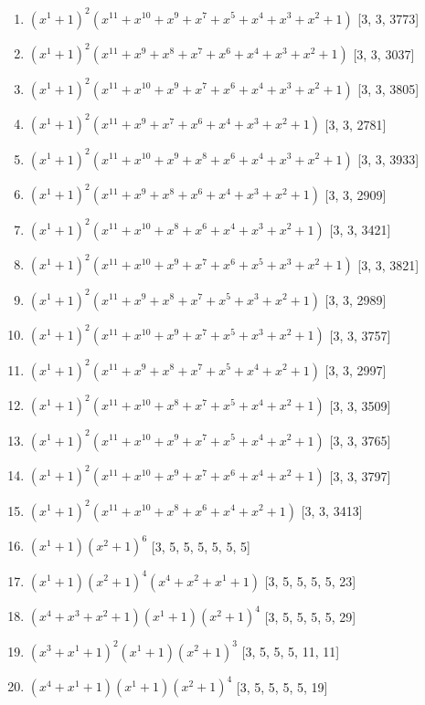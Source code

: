\documentclass[10pt,twocolumn]{article}
\begin{document}
\begin{enumerate}
\item $(x^{1} + 1)^{2}(x^{11} + x^{10} + x^{9} + x^{7} + x^{5} + x^{4} + x^{3} + x^{2} + 1)$  [3, 3, 3773]
\item $(x^{1} + 1)^{2}(x^{11} + x^{9} + x^{8} + x^{7} + x^{6} + x^{4} + x^{3} + x^{2} + 1)$  [3, 3, 3037]
\item $(x^{1} + 1)^{2}(x^{11} + x^{10} + x^{9} + x^{7} + x^{6} + x^{4} + x^{3} + x^{2} + 1)$  [3, 3, 3805]
\item $(x^{1} + 1)^{2}(x^{11} + x^{9} + x^{7} + x^{6} + x^{4} + x^{3} + x^{2} + 1)$  [3, 3, 2781]
\item $(x^{1} + 1)^{2}(x^{11} + x^{10} + x^{9} + x^{8} + x^{6} + x^{4} + x^{3} + x^{2} + 1)$  [3, 3, 3933]
\item $(x^{1} + 1)^{2}(x^{11} + x^{9} + x^{8} + x^{6} + x^{4} + x^{3} + x^{2} + 1)$  [3, 3, 2909]
\item $(x^{1} + 1)^{2}(x^{11} + x^{10} + x^{8} + x^{6} + x^{4} + x^{3} + x^{2} + 1)$  [3, 3, 3421]
\item $(x^{1} + 1)^{2}(x^{11} + x^{10} + x^{9} + x^{7} + x^{6} + x^{5} + x^{3} + x^{2} + 1)$  [3, 3, 3821]
\item $(x^{1} + 1)^{2}(x^{11} + x^{9} + x^{8} + x^{7} + x^{5} + x^{3} + x^{2} + 1)$  [3, 3, 2989]
\item $(x^{1} + 1)^{2}(x^{11} + x^{10} + x^{9} + x^{7} + x^{5} + x^{3} + x^{2} + 1)$  [3, 3, 3757]
\item $(x^{1} + 1)^{2}(x^{11} + x^{9} + x^{8} + x^{7} + x^{5} + x^{4} + x^{2} + 1)$  [3, 3, 2997]
\item $(x^{1} + 1)^{2}(x^{11} + x^{10} + x^{8} + x^{7} + x^{5} + x^{4} + x^{2} + 1)$  [3, 3, 3509]
\item $(x^{1} + 1)^{2}(x^{11} + x^{10} + x^{9} + x^{7} + x^{5} + x^{4} + x^{2} + 1)$  [3, 3, 3765]
\item $(x^{1} + 1)^{2}(x^{11} + x^{10} + x^{9} + x^{7} + x^{6} + x^{4} + x^{2} + 1)$  [3, 3, 3797]
\item $(x^{1} + 1)^{2}(x^{11} + x^{10} + x^{8} + x^{6} + x^{4} + x^{2} + 1)$  [3, 3, 3413]
\item $(x^{1} + 1)(x^{2} + 1)^{6}$  [3, 5, 5, 5, 5, 5, 5]
\item $(x^{1} + 1)(x^{2} + 1)^{4}(x^{4} + x^{2} + x^{1} + 1)$  [3, 5, 5, 5, 5, 23]
\item $(x^{4} + x^{3} + x^{2} + 1)(x^{1} + 1)(x^{2} + 1)^{4}$  [3, 5, 5, 5, 5, 29]
\item $(x^{3} + x^{1} + 1)^{2}(x^{1} + 1)(x^{2} + 1)^{3}$  [3, 5, 5, 5, 11, 11]
\item $(x^{4} + x^{1} + 1)(x^{1} + 1)(x^{2} + 1)^{4}$  [3, 5, 5, 5, 5, 19]

\end{enumerate}
\end{document}
